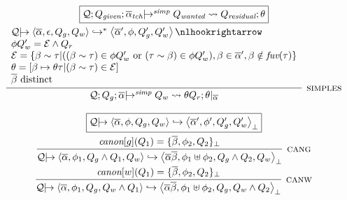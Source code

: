 \documentclass{article}
\newcommand{\multi}[1]{{\overline{#1}}}
\newcommand{\Q}{\mathcal{Q}}
\newcommand{\arrowish}{|\!\!\!\rightarrow}
\newcommand{\rulen}[1]{\textsc{#1}}
\newcommand{\angles}[1]{\left\langle #1 \right\rangle}
\newcommand{\disjointunion}{\uplus}
\newcommand{\Epsilon}{\mathcal{E}}
\begin{document}
\[
\begin{array}{c}

\framebox{$\Q; Q_\textit{given}; \multi{\alpha}_\textit{tch} \arrowish^\textit{simp} Q_\textit{wanted} \rightsquigarrow Q_\textit{residual}; \theta$} \\
\\[-3mm]

\infer[\rulen{simples}]
  {\Q; Q_g; \multi{\alpha} \arrowish^\textit{simp} Q_w \rightsquigarrow \theta Q_r; \theta |_\multi{\alpha}
  }
  {\begin{array}{l}
   \Q \arrowish \angles{\multi{\alpha}, \epsilon, Q_g, Q_w} \hookrightarrow^* \angles{\multi{\alpha}', \phi, Q_g', Q_w'} \nlhookrightarrow \\
   \phi Q_w' = \Epsilon \land Q_r \\
   \Epsilon = \{ \beta \sim \tau | ((\beta \sim \tau) \in \phi Q_w' ~ \text{or} ~ (\tau \sim \beta) \in \phi Q_w'), \beta \in \multi{\alpha}', \beta \notin \textit{fuv}(\tau) \} \\
   \theta = [\beta \mapsto \theta \tau | (\beta \sim \tau) \in \Epsilon] \\
   \multi{\beta} ~ \text{distinct}
   \end{array}
   } \\
\\

\framebox{$\Q \arrowish \angles{\multi{\alpha}, \phi, Q_g, Q_w} \hookrightarrow \angles{\multi{\alpha}', \phi', Q_g', Q_w'}_\bot$} \\
\\[-3mm]

\infer[\rulen{cang}]
  {\Q \arrowish \angles{\multi{\alpha}, \phi_1, Q_g \land Q_1, Q_w} \hookrightarrow
                \angles{\multi{\alpha} \multi{\beta}, \phi_1 \disjointunion \phi_2, Q_g \land Q_2, Q_w}_\bot}
  {\canon{g}{Q_1} = \{ \multi{\beta}, \phi_2, Q_2 \}_\bot
  }
\\[1mm]
\infer[\rulen{canw}]
  {\Q \arrowish \angles{\multi{\alpha}, \phi_1, Q_g, Q_w \land Q_1} \hookrightarrow
                \angles{\multi{\alpha} \multi{\beta}, \phi_1 \disjointunion \phi_2, Q_g, Q_w \land Q_2}_\bot}
  {\canon{w}{Q_1} = \{ \multi{\beta}, \phi_2, Q_2 \}_\bot}
\\[2mm]


\end{array}\]
\end{document}
